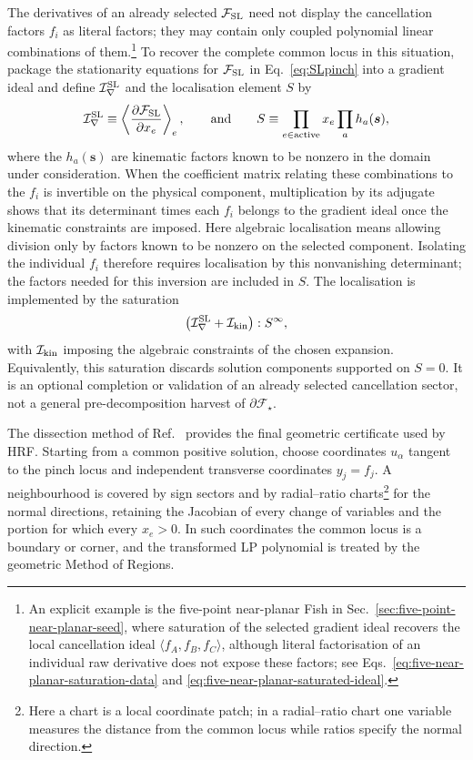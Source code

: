 \documentclass[a4paper,11pt]{article}
\newcommand{\s}{\boldsymbol{s}}
\newcommand{\FSL}{\mathcal F_{\rm SL}}
\begin{document}
The derivatives of an already selected \(\FSL\) need not display the
cancellation factors \(f_i\) as literal factors; they may contain only
coupled polynomial linear combinations of them.\footnote{An explicit example
is the five-point near-planar
Fish in Sec.~\ref{sec:five-point-near-planar-seed}, where saturation of the
selected gradient ideal recovers the local cancellation ideal
\(\langle f_A,f_B,f_C\rangle\), although literal factorisation of an
individual raw derivative does not expose these factors; see
Eqs.~\eqref{eq:five-near-planar-saturation-data} and
\eqref{eq:five-near-planar-saturated-ideal}.}  To recover the complete common
locus in this situation, package the stationarity equations for \(\FSL\) in
Eq.~\eqref{eq:SLpinch} into a gradient ideal and define
\(\mathcal I_\nabla^{\rm SL}\) and the localisation element \(S\) by
\begin{equation}
 \mathcal I_\nabla^{\rm SL}\equiv
 \left\langle\frac{\partial\FSL}{\partial x_e}\right\rangle_e,
 \qquad\text{and}\qquad
 S\equiv\prod_{e\in\mathrm{active}}x_e\prod_a h_a(\s),
 \label{eq:selected-gradient-ideal}
\end{equation}
where the \(h_a(\s)\) are kinematic factors known to be nonzero in the
domain under consideration.  When the coefficient matrix relating these
combinations to the \(f_i\) is invertible on the physical component,
multiplication by its adjugate shows that its determinant times each \(f_i\)
belongs to the gradient ideal once the kinematic constraints are imposed.
Here algebraic localisation means allowing division only by factors known to
be nonzero on the selected component.  Isolating the individual \(f_i\)
therefore requires localisation by this
nonvanishing determinant; the factors needed for this inversion are included
in \(S\).  The localisation is implemented by the saturation
\begin{equation}
 \bigl(\mathcal I_\nabla^{\rm SL}+\mathcal I_{\rm kin}\bigr):S^\infty,
 \label{eq:selected-gradient-saturation}
\end{equation}
with \(\mathcal I_{\rm kin}\) imposing the algebraic constraints of the
chosen expansion.  Equivalently, this saturation discards solution components
supported on \(S=0\).  It is an optional completion or validation of an
already selected cancellation sector, not a general pre-decomposition harvest of
\(\partial\mathcal F_\star\).

The dissection method of Ref.~\cite{Gardi:2024axt} provides the final
geometric certificate used by HRF.  Starting from a common positive solution,
choose coordinates \(u_\alpha\) tangent to the pinch locus and independent
transverse coordinates \(y_j=f_j\).  A neighbourhood is covered by sign
sectors and by radial--ratio charts\footnote{Here a chart is a local coordinate
patch; in a radial--ratio chart one variable measures the distance from the
common locus while ratios specify the normal direction.} for the normal directions, retaining the
Jacobian of every change of variables and the portion for which every
\(x_e>0\).  In such coordinates the common locus is a boundary or corner, and
the transformed LP polynomial is treated by the geometric Method of Regions.
\end{document}
